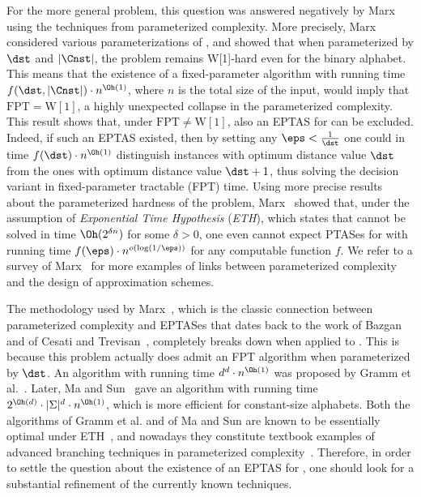 For the more general \clSubstring problem, this question was answered negatively by Marx~\cite{Marx08} using the techniques from parameterized complexity. More precisely, Marx considered various parameterizations of \clSubstring, and showed that when parameterized by $\dst$ and $|\Cnst|$, the problem remains W[1]-hard even for the binary alphabet. This means that the existence of a fixed-parameter algorithm with running time $f(\dst,|\Cnst|)\cdot n^{\Oh(1)}$, where $n$ is the total size of the input, would imply that $\mathrm{FPT}=\mathrm{W[1]}$, a highly unexpected collapse in the parameterized complexity. This result shows that, under $\mathrm{FPT}\neq \mathrm{W[1]}$, also an EPTAS for \clSubstring can be excluded. Indeed, if such an EPTAS existed, then by setting any $\eps<\frac{1}{\dst}$ one could in time $f(\dst)\cdot n^{\Oh(1)}$ distinguish instances with optimum distance value $\dst$ from the ones with optimum distance value $\dst+1$, thus solving the decision variant in fixed-parameter tractable (FPT) time. Using more precise results about the parameterized hardness of the \clique problem, Marx~\cite{Marx08} showed that, under the assumption of {\em{Exponential Time Hypothesis}} ({\em{ETH}}), which states that {} cannot be solved in time $\Oh(2^{\delta n})$ for some $\delta>0$, one even cannot expect PTASes for \clSubstring with running time $f(\eps)\cdot n^{o(\log (1/\eps))}$ for any computable function $f$. We refer to a survey of Marx~\cite{Marx08-survey} for more examples of links between parameterized complexity and the design of approximation schemes.

The methodology used by Marx~\cite{Marx08}, which is the classic connection between parameterized complexity and EPTASes that dates back to the work of Bazgan~\cite{bazgan:thesis} and of Cesati and Trevisan~\cite{CesatiT97}, completely breaks down when applied to \clString. This is because this problem actually does admit an FPT algorithm when parameterized by $\dst$. An algorithm with running time $d^d\cdot n^{\Oh(1)}$ was proposed by Gramm et al.~\cite{GrammNR03}. Later, Ma and Sun~\cite{MaS09} gave an algorithm with running time $2^{\Oh(d)}\cdot |\Sigma|^d\cdot n^{\Oh(1)}$, which is more efficient for constant-size alphabets. Both the algorithms of Gramm et al. and of Ma and Sun are known to be essentially optimal under ETH~\cite{LokshtanovMS11}, and nowadays they constitute textbook examples of advanced branching techniques in parameterized complexity~\cite{platypus}. Therefore, in order to settle the question about the existence of an EPTAS for \clString, one should look for a substantial refinement of the currently known techniques.

